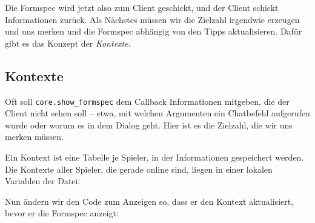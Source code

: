 Die Formspec wird jetzt also zum Client geschickt, und der Client
schickt Informationen zurück. Als Nächstes müssen wir die Zielzahl
irgendwie erzeugen und uns merken und die Formspec abhängig von den
Tipps aktualisieren. Dafür gibt es das Konzept der \emph{Kontexte}.

\subsection{Kontexte}\label{kontexte}

Oft soll
\texttt{core.\allowbreak{}show\_\allowbreak{}formspec}
dem Callback Informationen mitgeben, die der Client nicht sehen soll --
etwa, mit welchen Argumenten ein Chatbefehl
aufgerufen wurde oder worum es in dem Dialog geht. Hier ist es die
Zielzahl, die wir uns merken müssen.

Ein Kontext ist eine Tabelle je Spieler, in der Informationen
gespeichert werden. Die Kontexte aller Spieler, die gerade online sind,
liegen in einer lokalen Variablen der Datei:

\begin{Shaded}
\begin{Highlighting}[]
  \OperatorTok{=} \OperatorTok{\{\}}
 \OperatorTok{(}\OperatorTok{)}
      \OperatorTok{=} \OperatorTok{[}\OperatorTok{]}  \OperatorTok{\{\}}
    \OperatorTok{[}\OperatorTok{]} \OperatorTok{=} 
     

\OperatorTok{(}\OperatorTok{(}\OperatorTok{)}
    \OperatorTok{[}\OperatorTok{:}\OperatorTok{()]} \OperatorTok{=} 
\OperatorTok{)}
\end{Highlighting}
\end{Shaded}

Nun ändern wir den Code zum Anzeigen so, dass er den Kontext
aktualisiert, bevor er die Formspec anzeigt:

